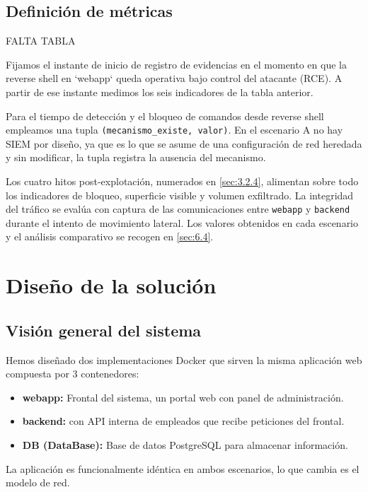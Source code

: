 \documentclass[11pt,spanish,listoffigures,listoftables]{tfgetsinf}
\begin{document}
    \section{Definición de métricas}
    \label{sec:3.4}
    FALTA TABLA
    
    Fijamos el instante de inicio de registro de evidencias en el momento en que la reverse shell en `webapp` queda operativa bajo control del atacante (RCE). A partir de ese instante medimos los seis indicadores de la tabla anterior.

    Para el tiempo de detección y el bloqueo de comandos desde reverse shell empleamos una tupla \texttt{(mecanismo\_existe, valor)}. En el escenario A no hay SIEM por diseño, ya que es lo que se asume de una configuración de red heredada y sin modificar, la tupla registra la ausencia del mecanismo.
    
    Los cuatro hitos post-explotación, numerados en \cref{sec:3.2.4}, alimentan sobre todo los indicadores de bloqueo, superficie visible y volumen exfiltrado. La integridad del tráfico se evalúa con captura de las comunicaciones entre \texttt{webapp} y \texttt{backend} durante el intento de movimiento lateral. Los valores obtenidos en cada escenario y el análisis comparativo se recogen en \cref{sec:6.4}.
    

\chapter{Diseño de la solución}
\label{sec:4}
    
    \section{Visión general del sistema}
    Hemos diseñado dos implementaciones Docker que sirven la misma aplicación web compuesta por 3 contenedores:
    \begin{itemize}
        \item \textbf{webapp:} Frontal del sistema, un portal web con panel de administración.
        \item \textbf{backend:} con API interna de empleados que recibe peticiones del frontal.
        \item \textbf{DB (DataBase):} Base de datos PostgreSQL para almacenar información.
    \end{itemize}
    La aplicación es funcionalmente idéntica en ambos escenarios, lo que cambia es el modelo de red.
    
\end{document}
